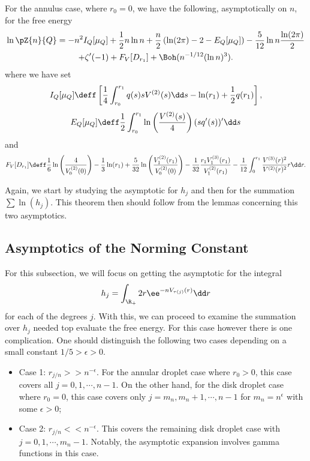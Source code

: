 \begin{teorema} 	\label{Theorem: Disk Free Energy}
	For the annulus case, where $r_0 = 0$, we have the following, asymptotically on $n$, for the free energy
	\begin{multline}
		\ln{\pZ{n}{Q}} = - n^2 I_Q[\mu_Q]  + \frac{1}{2} n \ln n + \frac{n}{2} \left(\ln(2\pi) - 2 - E_Q[\mu_Q]\right) - \frac{5}{12} \ln n \frac{\ln(2\pi)}{2} \\ + \zeta'(-1) + F_V[D_{r_1}] + \Boh(n^{-1/12}(\ln n)^3).
	\end{multline}
	where we have set
	\begin{equation}
		I_Q[\mu_Q] \deff \left[\frac{1}{4} \int_{r_0}^{r_1} q(s) s V^{(2)}(s) \dd s- \ln(r_1) + \frac{1}{2} q(r_1) \right],
	\end{equation}
	\begin{equation}
		E_Q[\mu_Q] \deff \frac{1}{2} \int_{r_0}^{r_1} \ln\left(\frac{V^{(2)}(s)}{4}\right) (sq'(s))' \dd s
	\end{equation}
	and
	\begin{equation}
		F_V[D_{r_1}] \deff \frac{1}{6} \ln{\left(\frac{4}{V^{(2)}_0(0)}\right)} - \frac{1}{3} \ln(r_1) + \frac{5}{32} \ln\left( \frac{V^{(2)}_1(r_1)}{V^{(2)}_{0}(0)} \right) - \frac{1}{32} \frac{r_1  V^{(3)}_1(r_1)}{V^{(2)}_1(r_1)} - \frac{1}{12} \int_{0}^{r_1} \frac{V^{(3)}(r)^2}{V^{(2)}(r)^{2}} r \dd r.
	\end{equation}
\end{teorema}

Again, we start by studying the asymptotic for $h_j$ and then for the summation $\sum \ln(h_j)$. This theorem then should follow from the lemmas concerning this two asymptotics.

\subsection{Asymptotics of the Norming Constant}

For this subsection, we will focus on getting the asymptotic for the integral
\begin{equation}
	h_j = \int_{\R_+} 2r \ee^{-n V_{\tau(j)}(r)} \dd r
\end{equation}
for each of the degrees $j$. With this, we can proceed to examine the summation over $h_j$ needed top evaluate the free energy. For this case however there is one complication. One should distinguish the following two cases depending on a small constant $1/5 > \epsilon > 0$. 

\begin{itemize}
	\item Case 1: $r_{j/n} >> n^{-\epsilon}$. For the annular droplet case where $r_0 > 0$, this case covers all $j = 0, 1, \cdots , n-1$. On the other hand, for the disk droplet case where $r_0 = 0$, this case covers only $j = m_n, m_n + 1, \cdots , n-1$ for $m_n = n^\epsilon$ with some $\epsilon > 0$;
	\item Case 2: $r_{j/n} << n^{-\epsilon}$. This covers the remaining disk droplet case with $j = 0, 1, \cdots, m_n-1$. Notably, the asymptotic expansion involves gamma functions in this case. 
\end{itemize}

